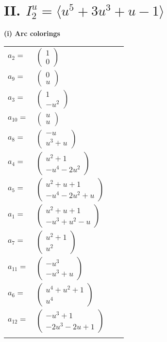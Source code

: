 \documentclass[1p]{elsarticle_modified}
\theoremstyle{definition}
\begin{document}
\centering \section*{II. $I^u_{2}= \langle u^5+3 u^3+u-1 \rangle$}
\flushleft \textbf{(i) Arc colorings}\\
\begin{tabular}{m{7pt} m{180pt} m{7pt} m{180pt} }
\flushright $a_{2}=$&$\begin{pmatrix}1\\0\end{pmatrix}$ \\
\flushright $a_{9}=$&$\begin{pmatrix}0\\u\end{pmatrix}$ \\
\flushright $a_{3}=$&$\begin{pmatrix}1\\- u^2\end{pmatrix}$ \\
\flushright $a_{10}=$&$\begin{pmatrix}u\\u\end{pmatrix}$ \\
\flushright $a_{8}=$&$\begin{pmatrix}- u\\u^3+u\end{pmatrix}$ \\
\flushright $a_{4}=$&$\begin{pmatrix}u^2+1\\- u^4-2 u^2\end{pmatrix}$ \\
\flushright $a_{5}=$&$\begin{pmatrix}u^2+u+1\\- u^4-2 u^2+u\end{pmatrix}$ \\
\flushright $a_{1}=$&$\begin{pmatrix}u^2+u+1\\- u^3+u^2- u\end{pmatrix}$ \\
\flushright $a_{7}=$&$\begin{pmatrix}u^2+1\\u^2\end{pmatrix}$ \\
\flushright $a_{11}=$&$\begin{pmatrix}- u^3\\- u^3+u\end{pmatrix}$ \\
\flushright $a_{6}=$&$\begin{pmatrix}u^4+u^2+1\\u^4\end{pmatrix}$ \\
\flushright $a_{12}=$&$\begin{pmatrix}- u^3+1\\-2 u^3-2 u+1\end{pmatrix}$\\&\end{tabular}
\end{document}
